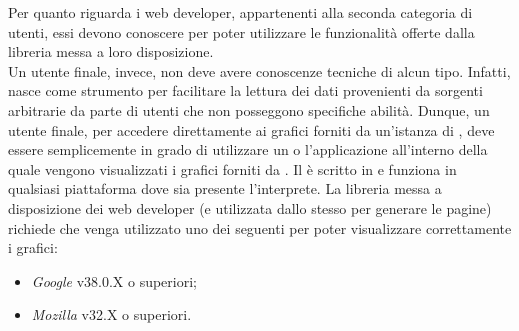 		Per quanto riguarda i web developer, appartenenti alla seconda categoria di utenti, essi devono conoscere  per poter utilizzare le funzionalità offerte dalla libreria messa a loro disposizione.\\
		Un utente finale, invece, non deve avere conoscenze tecniche di alcun tipo. Infatti,  nasce come strumento per facilitare la lettura dei dati provenienti da sorgenti arbitrarie da parte di utenti che non posseggono specifiche abilità. Dunque, un utente finale, per accedere direttamente ai grafici forniti da un'istanza di , deve essere semplicemente in grado di utilizzare un  o l'applicazione all'interno della quale vengono visualizzati i grafici forniti da .
		Il  è scritto in  e funziona in qualsiasi piattaforma dove sia presente l'interprete.
		La libreria messa a disposizione dei web developer (e utilizzata dallo stesso  per generare le pagine) richiede che venga utilizzato uno dei seguenti  per poter visualizzare correttamente i grafici:
		\begin{itemize}
			\item \emph{Google } v38.0.X o superiori;
			\item \emph{Mozilla } v32.X o superiori.
		\end{itemize}

